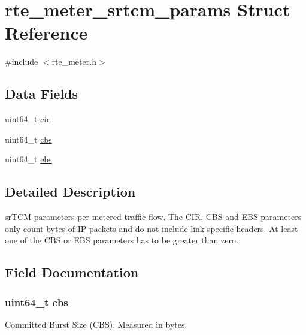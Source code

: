 \hypertarget{structrte__meter__srtcm__params}{}\section{rte\+\_\+meter\+\_\+srtcm\+\_\+params Struct Reference}
\label{structrte__meter__srtcm__params}


{\ttfamily \#include $<$rte\+\_\+meter.\+h$>$}

\subsection*{Data Fields}
\begin{DoxyCompactItemize}
\item 
uint64\+\_\+t \hyperlink{structrte__meter__srtcm__params_a882cbe4a787376c3a4d55bbf0b6e1f13}{cir}
\item 
uint64\+\_\+t \hyperlink{structrte__meter__srtcm__params_ad914d97dc6b389901af9ddee395827de}{cbs}
\item 
uint64\+\_\+t \hyperlink{structrte__meter__srtcm__params_aacbec96ca1e25912af9a0d5f72058f92}{ebs}
\end{DoxyCompactItemize}


\subsection{Detailed Description}
sr\+T\+C\+M parameters per metered traffic flow. The C\+I\+R, C\+B\+S and E\+B\+S parameters only count bytes of I\+P packets and do not include link specific headers. At least one of the C\+B\+S or E\+B\+S parameters has to be greater than zero. 

\subsection{Field Documentation}
\hypertarget{structrte__meter__srtcm__params_ad914d97dc6b389901af9ddee395827de}{}
\subsubsection[{cbs}]{\setlength{\rightskip}{0pt plus 5cm}uint64\+\_\+t cbs}\label{structrte__meter__srtcm__params_ad914d97dc6b389901af9ddee395827de}
Committed Burst Size (C\+B\+S). Measured in bytes. \hypertarget{structrte__meter__srtcm__params_a882cbe4a787376c3a4d55bbf0b6e1f13}{}
